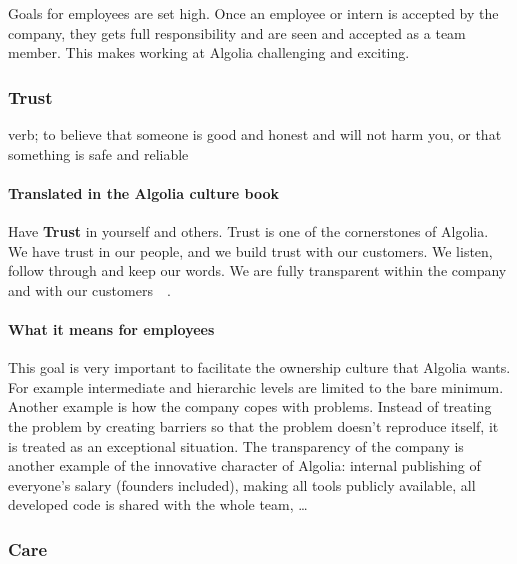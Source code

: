 Goals for employees are set high. Once an employee or intern is accepted by the company, they gets full responsibility and are seen and accepted as a team member. This makes working at Algolia challenging and exciting.

\subsubsection{Trust}
\label{ssub:trust}

\begin{definition}
verb; to believe that someone is good and honest and will not harm you, or that something is safe and reliable
\end{definition}


\paragraph{Translated in the Algolia culture book}

Have \textbf{Trust} in yourself and others. Trust is one of the cornerstones of Algolia. We have trust in our people, and we build trust with our customers. We listen, follow through and keep our words. We are fully transparent within the company and with our customers~\cite{algolia-careers}~.

\paragraph{What it means for employees}

This goal is very important to facilitate the ownership culture that Algolia wants. For example intermediate and hierarchic levels are limited to the bare minimum. Another example is how the company copes with problems. Instead of treating the problem by creating barriers so that the problem doesn't reproduce itself, it is treated as an exceptional situation. The transparency of the company is another example of the innovative character of Algolia: internal publishing of everyone's salary (founders included), making all tools publicly available, all developed code is shared with the whole team, \dots

\subsubsection{Care}
\label{ssub:care}


